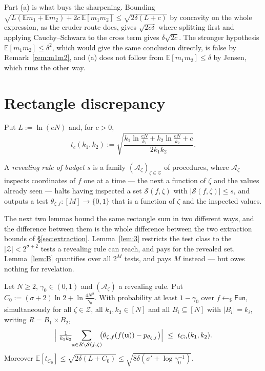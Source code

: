 \documentclass{aicr-solution}
\newcommand{\Fun}{\mathsf{Fun}}
\newcommand{\Exp}{\mathbb{E}}
\newcommand{\bits}{\{0,1\}}
\newcommand{\vu}{\mathbf{u}}
\begin{document}
Part (a) is what buys the sharpening. Bounding
$\sqrt{L(\Exp m_1 + \Exp m_2) + 2c\,\Exp[m_1m_2]} \le \sqrt{2\delta(L+c)}$ by
concavity on the whole expression, as the cruder route does, gives
$\sqrt{2c\delta}$ where splitting first and applying Cauchy--Schwarz to the cross
term gives $\delta\sqrt{2c}$. The stronger hypothesis
$\Exp[m_1m_2] \le \delta^{2}$, which would give the same conclusion directly, is
false by Remark~\ref{rem:m1m2}, and (a) does not follow from
$\Exp[m_1m_2] \le \delta$ by Jensen, which runs the other way.

\section{Rectangle discrepancy}\label{sec:rectangle}

Put $L := \ln(eN)$ and, for $c > 0$,
\begin{equation}\label{eq:tc}
  t_c(k_1,k_2) := \sqrt{\frac{k_1 \ln\frac{eN}{k_1}
  + k_2 \ln\frac{eN}{k_2} + c}{2k_1k_2}} .
\end{equation}

A \emph{revealing rule of budget $s$} is a family
$(\mathcal{A}_\zeta)_{\zeta \in \mathcal{Z}}$ of procedures, where
$\mathcal{A}_\zeta$ inspects coordinates of $f$ one at a time --- the next a
function of $\zeta$ and the values already seen --- halts having inspected a set
$\mathcal{S}(f,\zeta)$ with $|\mathcal{S}(f,\zeta)| \le s$, and outputs a test
$\theta_{\zeta,f} : [M] \to \bits$ that is a function of $\zeta$ and the inspected
values.

The next two lemmas bound the same rectangle sum in two different ways, and the
difference between them is the whole difference between the two extraction bounds
of \S\ref{sec:extraction}. Lemma~\ref{lem:3} restricts the test class to the
$|\mathcal{Z}| < 2^{\sigma+2}$ tests a revealing rule can reach, and pays for the
revealed set. Lemma~\ref{lem:B} quantifies over all $2^{M}$ tests, and pays $M$
instead --- but owes nothing for revelation.

\begin{lemma}\label{lem:3}
Let $N \ge 2$, $\gamma_0 \in (0,1)$ and $(\mathcal{A}_\zeta)$ a revealing rule. Put
$C_0 := (\sigma+2)\ln 2 + \ln \frac{4N^{2}}{\gamma_0}$. With probability at least
$1 - \gamma_0$ over $f \gets_{\$} \Fun$, simultaneously for all
$\zeta \in \mathcal{Z}$, all $k_1,k_2 \in [N]$ and all $B_i \subseteq [N]$ with
$|B_i| = k_i$, writing $R = B_1 \times B_2$,
\[
  \Bigl|\ \tfrac{1}{k_1k_2}\!\!\sum_{\vu \in R \setminus \mathcal{S}(f,\zeta)}\!\!
  \bigl(\theta_{\zeta,f}(f(\vu)) - p_{\theta_{\zeta,f}}\bigr)\Bigr|
  \ \le\ t_{C_0}(k_1,k_2).
\]
Moreover $\Exp[t_{C_0}] \le \sqrt{2\delta(L+C_0)}
\le \sqrt{8\delta(\sigma' + \log\gamma_0^{-1})}$.
\end{lemma}
\end{document}
